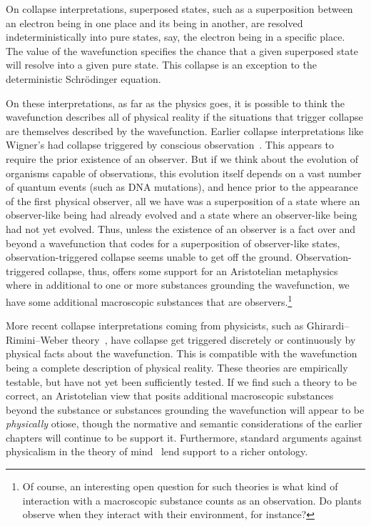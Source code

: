 On collapse interpretations, superposed states, such as a superposition between an electron being in one place and its 
being in another, are resolved indeterministically into pure states, say, the electron being in a specific place. The 
value of the wavefunction specifies the chance that a given superposed state will resolve into a given pure state. 
This collapse is an exception to the deterministic Schr\"{o}dinger equation.

On these interpretations, as far as the physics goes, it is possible to think the wavefunction describes all of physical 
reality if the situations that trigger collapse are themselves described by the wavefunction. Earlier collapse interpretations like Wigner's had collapse triggered by conscious observation~\parencite{WignerCollapse}. This appears to require the prior existence of an observer. But if we think about 
the evolution of organisms capable of observations, this evolution itself depends on a vast number of quantum events (such 
as DNA mutations), and hence prior to the appearance of the first physical observer, all we have was a superposition 
of a state where an observer-like being had already evolved and a state where an observer-like being had not yet evolved. 
Thus, unless the existence of an observer is a fact over and beyond a wavefunction that codes for a superposition of 
observer-like states, observation-triggered collapse seems unable to get off the ground. Observation-triggered collapse,
thus, offers some support for an Aristotelian metaphysics where in additional to one or more substances grounding the 
wavefunction, we have some additional macroscopic substances that are observers.\footnote{Of course, an interesting open question for such theories is what kind of interaction with a macroscopic substance counts as an observation. Do plants observe when they interact
with their environment, for instance?}

More recent collapse interpretations coming from physicists, such as Ghirardi–Rimini–Weber theory~\parencite{GRW}, have collapse get triggered discretely or continuously by physical facts about the wavefunction. This is compatible with the wavefunction being a 
complete description of physical reality. These theories are empirically testable, but have not yet been sufficiently
tested. If we find such a theory to be correct, an Aristotelian view that posits additional macroscopic substances 
beyond the substance or substances grounding the wavefunction will appear to be \textit{physically} otiose, though the
normative and semantic considerations of the earlier chapters will continue to be support it. Furthermore, standard 
arguments against physicalism in the theory of mind~ lend support to a richer ontology.

